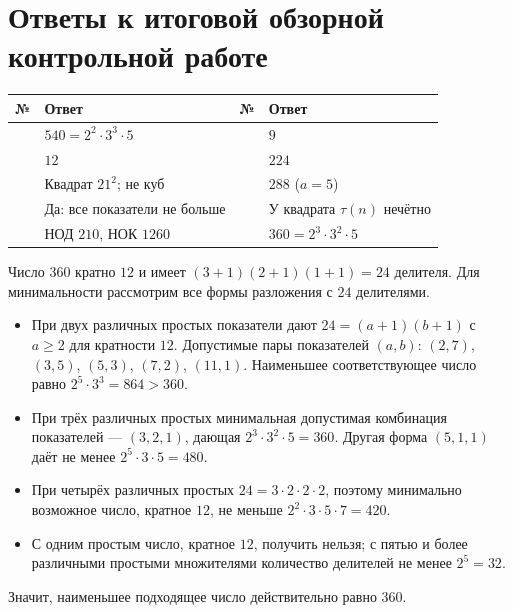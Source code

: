 \documentclass[11pt,a4paper]{article}
\newcommand{\concept}[1]{\par\needspace{4\baselineskip}{\color{navy}\bfseries #1.}\enspace}
\newcommand{\anstable}[1]{\begin{center}\small\begin{tabularx}{\linewidth}{>{\centering\arraybackslash}p{9mm}X>{\centering\arraybackslash}p{9mm}X}\toprule\textbf{№}&\textbf{Ответ}&\textbf{№}&\textbf{Ответ}\\\midrule #1\\\bottomrule\end{tabularx}\end{center}}
\begin{document}
\section*{Ответы к итоговой обзорной контрольной работе}
\anstable{
1&$540=2^2\cdot3^3\cdot5$&6&$9$\\
2&$12$&7&$224$\\
3&Квадрат $21^2$; не куб&8&$288$ ($a=5$)\\
4&Да: все показатели не больше&9&У квадрата $\tau(n)$ нечётно\\
5&НОД $210$, НОК $1260$&10&$360=2^3\cdot3^2\cdot5$
}
\vspace{4mm}
\concept{Пояснение к задаче 10} Число $360$ кратно $12$ и имеет $(3+1)(2+1)(1+1)=24$ делителя. Для минимальности рассмотрим все формы разложения с $24$ делителями.
\begin{itemize}
\item При двух различных простых показатели дают $24=(a+1)(b+1)$ с $a\ge2$ для кратности $12$. Допустимые пары показателей $(a,b)$: $(2,7)$, $(3,5)$, $(5,3)$, $(7,2)$, $(11,1)$. Наименьшее соответствующее число равно $2^5\cdot3^3=864>360$.
\item При трёх различных простых минимальная допустимая комбинация показателей --- $(3,2,1)$, дающая $2^3\cdot3^2\cdot5=360$. Другая форма $(5,1,1)$ даёт не менее $2^5\cdot3\cdot5=480$.
\item При четырёх различных простых $24=3\cdot2\cdot2\cdot2$, поэтому минимально возможное число, кратное $12$, не меньше $2^2\cdot3\cdot5\cdot7=420$.
\item С одним простым число, кратное $12$, получить нельзя; с пятью и более различными простыми множителями количество делителей не менее $2^5=32$.
\end{itemize}
Значит, наименьшее подходящее число действительно равно $360$.

\clearpage
\end{document}
